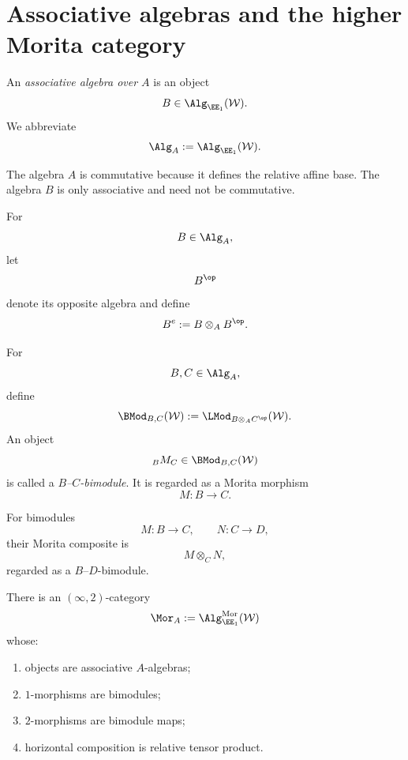 \section{Associative algebras and the higher Morita category}
\label{sec:associative-algebras-relative-base}

\begin{definition}
\label{def:associative-algebra-over-base}
An \emph{associative algebra over $A$} is an object
\[
    B
    \in
    \Alg_{\EE_1}(\mathcal W).
\]
We abbreviate
\[
    \Alg_A
    :=
    \Alg_{\EE_1}(\mathcal W).
\]
\end{definition}

\begin{remark}
\label{rem:commutative-base-noncommutative-algebra}
The algebra $A$ is commutative because it defines the relative affine
base. The algebra $B$ is only associative and need not be commutative.
\end{remark}

\begin{definition}
\label{def:opposite-enveloping-algebra}
For
\[
    B\in\Alg_A,
\]
let
\[
    B^{\op}
\]
denote its opposite algebra and define
\[
    B^e
    :=
    B\otimes_A B^{\op}.
\]
\end{definition}

\begin{definition}[Bimodule]
\label{def:relative-bimodule}
For
\[
    B,C\in\Alg_A,
\]
define
\[
    \BMod_{B,C}(\mathcal W)
    :=
    \LMod_{B\otimes_A C^{\op}}(\mathcal W).
\]
An object
\[
    {}_B M_C
    \in
    \BMod_{B,C}(\mathcal W)
\]
is called a \emph{$B$--$C$-bimodule}. It is regarded as a Morita morphism
\[
    M
    \colon
    B
    \longrightarrow
    C.
\]
\end{definition}

\begin{construction}
\label{con:morita-composition}
For bimodules
\[
    M
    \colon
    B
    \longrightarrow
    C,
    \qquad
    N
    \colon
    C
    \longrightarrow
    D,
\]
their Morita composite is
\[
    M\otimes_C N,
\]
regarded as a $B$--$D$-bimodule.
\end{construction}

\begin{theorem}
\label{thm:higher-morita-category}
There is an $(\infty,2)$-category
\[
    \Mor_A
    :=
    \Alg_{\EE_1}^{\mathrm{Mor}}(\mathcal W)
\]
whose:
\begin{enumerate}[label=(\roman*)]
    \item objects are associative $A$-algebras;

    \item $1$-morphisms are bimodules;

    \item $2$-morphisms are bimodule maps;

    \item horizontal composition is relative tensor product.
\end{enumerate}
\end{theorem}

